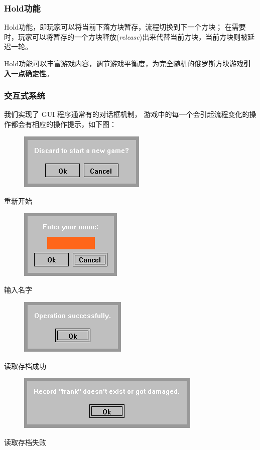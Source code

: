 \documentclass{style/ucasproposal}
\begin{document}
\subsubsection{Hold功能}
Hold功能，即玩家可以将当前下落方块暂存，流程切换到下一个方块；
在需要时，玩家可以将暂存的一个方块释放(\textit{release})出来代替当前方块，当前方块则被延迟一轮。

Hold功能可以丰富游戏内容，调节游戏平衡度，为完全随机的俄罗斯方块游戏\textbf{引入一点确定性}。

\subsubsection{交互式系统}
我们实现了 GUI 程序通常有的对话框机制，
游戏中的每一个会引起流程变化的操作都会有相应的操作提示，如下图：

\begin{center}

\begin{figure}[H]
\center
    \includegraphics[height=0.15\textheight]{./img/restart.png}
\end{figure}
重新开始

\begin{figure}[H]
\center
    \includegraphics[height=0.18\textheight]{./img/name-input.png}
\end{figure}
输入名字

\begin{figure}[H]
\center
    \includegraphics[height=0.15\textheight]{./img/success.png}
\end{figure}
读取存档成功

\begin{figure}[H]
\center
    \includegraphics[height=0.15\textheight]{./img/failure.png}
\end{figure}
读取存档失败
\end{center}
\end{document}
